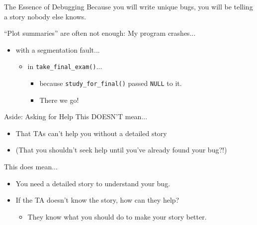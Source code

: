 \documentclass[xcolor=dvipsnames]{beamer}
\begin{document}
\begin{frame}{The Essence of Debugging}
	Because you will write unique bugs, you will be telling a story nobody else knows.

	\linegap
	``Plot summaries'' are often not enough: My program crashes...
	\pause
	\begin{itemize}
		\item with a segmentation fault...
		\pause
		\begin{itemize}
			\item in \texttt{take\_final\_exam()}...
			\pause
			\begin{itemize}
				\item because \texttt{study\_for\_final()} passed \texttt{NULL} to it.
				\item There we go!
			\end{itemize}
		\end{itemize}
	\end{itemize}
\end{frame}

\begin{frame}{Aside: Asking for Help}
	This DOESN'T mean...
	\begin{itemize}
		\item That TAs can't help you without a detailed story
		\item (That you shouldn't seek help until you've already found your bug?!)
	\end{itemize}
	\pause
	\linegap

	This does mean...
	\begin{itemize}
		\item You need a detailed story to understand your bug.
		\item If the TA doesn't know the story, how can they help?
		\pause
		\begin{itemize}
			\item They know what you should do to make your story better.
		\end{itemize}
	\end{itemize}
\end{frame}

%
%
\end{document}
